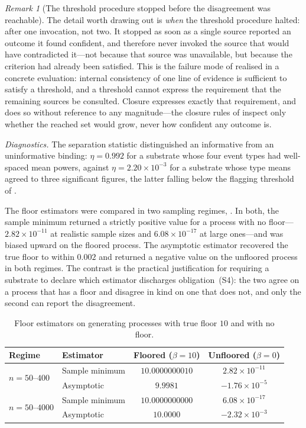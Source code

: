 \documentclass[11pt,a4paper]{article}
\theoremstyle{thmstyle}
\theoremstyle{definition}
\theoremstyle{remark}
\newtheorem{remark}[theorem]{Remark}
\newcommand{\flo}{\beta}
\begin{document}
\begin{remark}[The threshold procedure stopped before the disagreement was
reachable]
\label{rem:threshold-early}
The detail worth drawing out is \emph{when} the threshold procedure halted:
after one invocation, not two. It stopped as soon as a single source reported
an outcome it found confident, and therefore never invoked the source that
would have contradicted it---not because that source was unavailable, but
because the criterion had already been satisfied. This is the failure mode of
 realised in a concrete evaluation: internal
consistency of one line of evidence is sufficient to satisfy a threshold, and
a threshold cannot express the requirement that the remaining sources be
consulted. Closure expresses exactly that requirement, and does so without
reference to any magnitude---the closure rules of  inspect
only whether the reached set would grow, never how confident any outcome is.
\end{remark}

\emph{Diagnostics.} The separation statistic distinguished an informative
from an uninformative binding: $\eta=0.992$ for a substrate whose four event
types had well-spaced mean powers, against $\eta=2.20\times10^{-3}$ for a
substrate whose type means agreed to three significant figures, the latter
falling below the flagging threshold of .

The floor estimators were compared in two sampling regimes,
. In both, the sample minimum returned a strictly positive
value for a process with no floor---$2.82\times10^{-11}$ at realistic sample
sizes and $6.08\times10^{-17}$ at large ones---and was biased upward on the
floored process. The asymptotic estimator recovered the true floor to within
$0.002$ and returned a negative value on the unfloored process in both
regimes. The contrast is the practical justification for requiring a
substrate to declare which estimator discharges obligation~(S4): the two
agree on a process that has a floor and disagree in kind on one that does
not, and only the second can report the disagreement.

\begin{table}[H]
\centering
\caption{Floor estimators on generating processes with true floor $10$ and
with no floor.}
\label{tab:floor}
\begin{tabular}{@{}llcc@{}}
\toprule
Regime & Estimator & Floored ($\flo=10$) & Unfloored ($\flo=0$)\\
\midrule
\multirow{2}{*}{$n=50$--$400$}
 & Sample minimum & $10.0000000010$ & $2.82\times10^{-11}$\\
 & Asymptotic     & $9.9981$        & $-1.76\times10^{-5}$\\
\midrule
\multirow{2}{*}{$n=50$--$4000$}
 & Sample minimum & $10.0000000000$ & $6.08\times10^{-17}$\\
 & Asymptotic     & $10.0000$       & $-2.32\times10^{-3}$\\
\bottomrule
\end{tabular}
\end{table}
\end{document}
